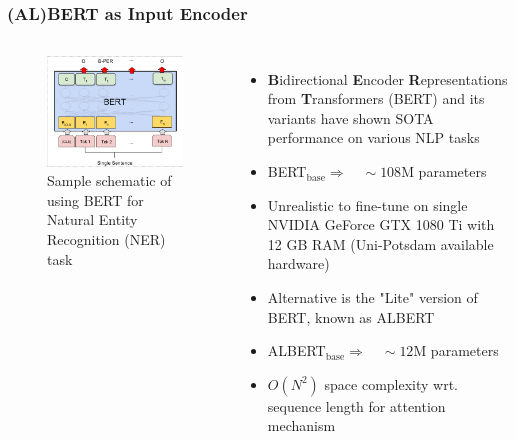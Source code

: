 \documentclass{beamer}
\begin{document}
\subsection{}
\begin{framefont}{\footnotesize}
	\begin{frame}
		\frametitle{(AL)BERT as Input Encoder}
			\begin{columns}
				\begin{figure}
				    \centering
					\includegraphics[trim={0.2cm 0.2cm 0.2cm 0.2cm},clip,width=5.3cm]{bert.png}
					\caption{Sample schematic of using BERT for Natural Entity Recognition (NER) task \citep{devlin2018bert}}
				\end{figure}
				\begin{itemize}
					\setlength\itemsep{1.0em}
					\item \textbf{B}idirectional \textbf{E}ncoder \textbf{R}epresentations from \textbf{T}ransformers (BERT) and its variants have shown SOTA performance on various NLP tasks \citep{devlin2018bert}
					\item BERT$_{\text{base}} \Longrightarrow \quad \sim 108$M parameters
					\item Unrealistic to fine-tune on single NVIDIA GeForce GTX 1080 Ti with 12 GB RAM (Uni-Potsdam available hardware)
					\item Alternative is the "Lite" version of BERT, known as ALBERT \citep{lan2019albert}
					\item ALBERT$_{\text{base}} \Longrightarrow \quad \sim 12$M parameters
					\item $O(N^2)$ space complexity wrt. sequence length for attention mechanism
				\end{itemize}
			\end{columns}
	\end{frame}
\end{framefont}
\end{document}
